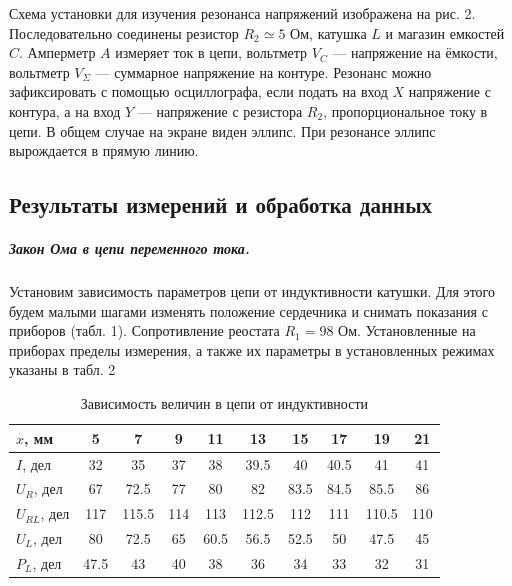 \documentclass[12pt,a4paper]{article}
\begin{document}
Схема установки для изучения резонанса напряжений изображена на рис. 2. 
Последовательно соединены резистор $R_2 \simeq 5$ Ом, катушка $L$ и магазин емкостей $C$. 
Амперметр $A$ измеряет ток в цепи, вольтметр $V_C$ — напряжение на ёмкости, вольтметр $V_\Sigma$ — суммарное напряжение на контуре. 
Резонанс можно зафиксировать с помощью осциллографа, если подать на вход $X$ напряжение с контура, а на вход $Y$ — напряжение с резистора $R_2$, пропорциональное току в цепи. 
В общем случае на экране виден эллипс. 
При резонансе эллипс вырождается в прямую линию.
\newline
\newline
\newline
\newline

\subsection*{Результаты измерений и обработка данных}
\subparagraph*{Закон Ома в цепи переменного тока.} 
Установим зависимость параметров цепи от индуктивности катушки. 
Для этого будем малыми шагами изменять положение сердечника и снимать показания с приборов (табл. 1).
Сопротивление реостата $R_1 = 98$ Ом. 
Установленные на приборах пределы измерения, а также их параметры в установленных режимах указаны в табл. 2

\begin{table}[H]
	\centering
	\begin{tabular}{|l|c|c|c|c|c|c|c|c|c|}
	\hline
	$x$, мм      & 5    & 7     & 9   & 11   & 13    & 15   & 17   & 19    & 21  \\ \hline
	$I$, дел     & 32   & 35    & 37  & 38   & 39.5  & 40   & 40.5 & 41    & 41  \\ \hline
	$U_R$, дел  & 67   & 72.5  & 77  & 80   & 82    & 83.5 & 84.5 & 85.5  & 86  \\ \hline
	$U_{RL}$, дел & 117  & 115.5 & 114 & 113  & 112.5 & 112  & 111  & 110.5 & 110 \\ \hline
	$U_L$, дел  & 80   & 72.5  & 65  & 60.5 & 56.5  & 52.5 & 50   & 47.5  & 45  \\ \hline
	$P_L$, дел  & 47.5 & 43    & 40  & 38   & 36    & 34   & 33   & 32    & 31  \\ \hline
	\end{tabular}
	\caption{Зависимость величин в цепи от индуктивности}
\end{table}
\end{document}
